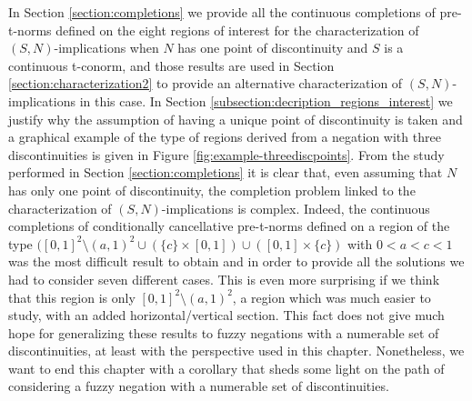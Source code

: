 In Section \ref{section:completions} we provide all the continuous completions of pre-t-norms defined on the eight regions of interest for the characterization of $(S,N)$-implications when $N$ has one point of discontinuity and $S$ is a continuous t-conorm, and those results are used in Section \ref{section:characterization2} to provide an alternative characterization of $(S,N)$-implications in this case. In Section \ref{subsection:decription_regions_interest} we justify why the assumption of having a unique point of discontinuity is taken and a graphical example of the type of regions derived from a negation with three discontinuities is given in Figure \ref{fig:example-threediscpoints}. From the study performed in Section \ref{section:completions} it is clear that, even assuming that $N$ has only one point of discontinuity, the completion problem linked to the characterization of $(S,N)$-implications is complex. Indeed, the continuous completions of conditionally cancellative pre-t-norms defined on a region of the type $([0,1]^2 \setminus(a,1)^2 \cup (\{c\} \times [0,1]) \cup ([0,1] \times \{c\})$ with $0<a<c<1$ was the most difficult result to obtain and in order to provide all the solutions we had to consider seven different cases. This is even more surprising if we think that this region is only $[0,1]^2 \setminus(a,1)^2$, a region which was much easier to study, with an added horizontal/vertical section. This fact does not give much hope for generalizing these results to fuzzy negations with a numerable set of discontinuities, at least with the perspective used in this chapter. Nonetheless, we want to end this chapter with a corollary that sheds some light on the path of considering a fuzzy negation with a numerable set of discontinuities. 

